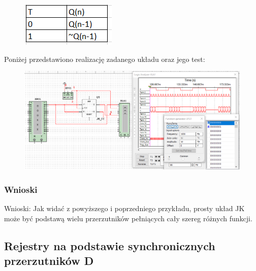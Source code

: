 \documentclass[12pt,a4paper]{article}
\begin{document}
\begin{figure}[H]
\centering
\includegraphics{img/3eTruthTable}
\end{figure}

Poniżej przedstawiono realizację zadanego układu oraz jego test:

\begin{figure}[H]
\centering
\includegraphics[width=\textwidth]{img/3g}
\end{figure}

\subsubsection{Wnioski}

Wnioski: Jak widać z powyższego i poprzedniego przykładu, prosty układ JK może być podstawą wielu przerzutników pełniących cały szereg różnych funkcji. 

\subsection{Rejestry na podstawie synchronicznych przerzutników D}
\end{document}
